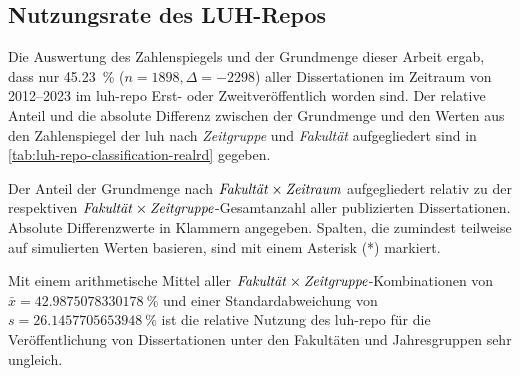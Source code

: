 \subsection{Nutzungsrate des LUH-Repos}\label{sec:luh-repo-results-zahlenspiegel}
Die Auswertung des Zahlenspiegels und der Grundmenge dieser Arbeit ergab, dass nur \SI[round-mode=places,round-precision=2]{45,23}{\percent} ($n=\num{1898},\Delta=\num{-2298}$) aller Dissertationen im Zeitraum von 2012--2023 im \gls{luh-repo} Erst- oder Zweitveröffentlich worden sind.
Der relative Anteil und die absolute Differenz zwischen der Grundmenge und den Werten aus den Zahlenspiegel der \gls{luh} nach \textit{Zeitgruppe} und \textit{Fakultät} aufgegliedert sind in \cref{tab:luh-repo-classification-realrd} gegeben.
\begin{table}[!htbp]
	\caption{Der Anteil der Grundmenge nach $\text{\textit{Fakultät}}\times\text{\textit{Zeitraum}}$ aufgegliedert relativ zu der respektiven $\text{\textit{Fakultät}}\times\text{\textit{Zeitgruppe}}$-Gesamtanzahl aller publizierten Dissertationen.
    Absolute Differenzwerte in Klammern angegeben.
    Spalten, die zumindest teilweise auf simulierten Werten basieren, sind mit einem Asterisk (*) markiert.}
    
    \label{tab:luh-repo-zahlenspiegel-relative-grundmenge}
\end{table}
Mit einem arithmetische Mittel aller $\text{\textit{Fakultät}}\times\text{\textit{Zeitgruppe}}$-Kombinationen von $\bar{x}=\SI[round-mode=places,round-precision=2]{42.9875078330178}{\percent}$ und einer Standardabweichung von $s=\SI[round-mode=places,round-precision=2]{26.1457705653948}{\percent}$ ist die relative Nutzung des \gls{luh-repo} für die Veröffentlichung von Dissertationen unter den Fakultäten und Jahresgruppen sehr ungleich.

